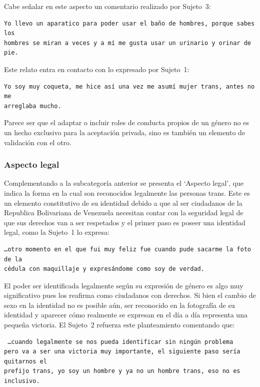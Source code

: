 Cabe señalar en este aspecto un comentario realizado por Sujeto~3:

\begin{verbatim}
Yo llevo un aparatico para poder usar el baño de hombres, porque sabes los
hombres se miran a veces y a mí me gusta usar un urinario y orinar de pie.
\end{verbatim}

Este relato entra en contacto con lo expresado por Sujeto~1:

\begin{verbatim}
Yo soy muy coqueta, me hice así una vez me asumí mujer trans, antes no me
arreglaba mucho.
\end{verbatim}

Parece ser que el adaptar o incluir roles de conducta propios de un género no es
un hecho exclusivo para la aceptación privada, sino es también un elemento
de validación con el otro.

\subsubsection{Aspecto legal}

Complementando a la subcategoría anterior se presenta el ‘Aspecto legal’, que
indica la forma en la cual son reconocidos legalmente las personas trans. Este
es un elemento constitutivo de su identidad debido a que al ser ciudadanos de la
Republica Bolivariana de Venezuela necesitan contar con la seguridad legal de
que sus derechos van a ser respetados y el primer paso es poseer una identidad
legal, como la Sujeto~1 lo expresa:

\begin{verbatim}
…otro momento en el que fui muy feliz fue cuando pude sacarme la foto de la
cédula con maquillaje y expresándome como soy de verdad.
\end{verbatim}

El poder ser identificada legalmente según su expresión de género es algo muy
significativo pues los reafirma como ciudadanos con derechos. Si bien el cambio
de sexo en la identidad no es posible aún, ser reconocido en la fotografía de su
identidad y aparecer cómo realmente se expresan en el día a día representa una
pequeña victoria. El Sujeto~2 refuerza este planteamiento comentando que:

\begin{verbatim} …cuando legalmente se nos pueda identificar sin ningún problema
pero va a ser una victoria muy importante, el siguiente paso sería quitarnos el
prefijo trans, yo soy un hombre y ya no un hombre trans, eso no es inclusivo.
\end{verbatim} %

